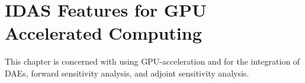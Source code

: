 \chapter{IDAS Features for GPU Accelerated Computing}\label{s:idagpu}

This chapter is concerned with using GPU-acceleration and {\idas} for the integration
of DAEs, forward sensitivity analysis, and adjoint sensitivity analysis.


